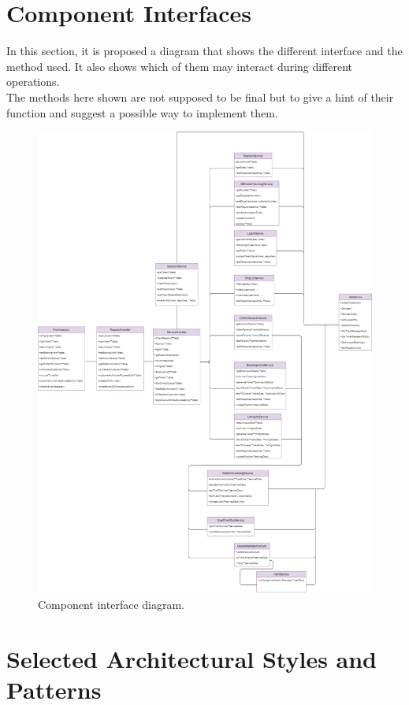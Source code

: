 \section{Component Interfaces}
In this section, it is proposed a diagram that shows the different interface and the method used. It also shows which of them may interact during different operations. \\
The methods here shown are not supposed to be final but to give a hint of their function and suggest a possible way to implement them.
\begin{figure}[H]
    \centering
    \includegraphics[width=1.0\textwidth]{images/Component_class_diagram.png}
    \caption{Component interface diagram.}\label{fig:Component interface diagram}
\end{figure}


\section{Selected Architectural Styles and Patterns}

